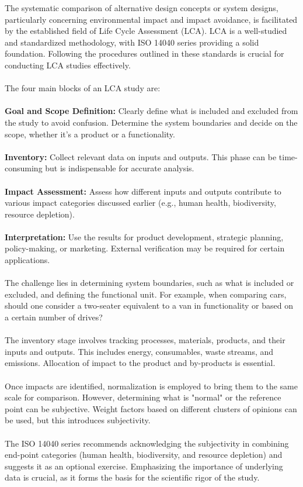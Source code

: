 \documentclass[../summary.tex]{subfiles}
\begin{document}
The systematic comparison of alternative design concepts or system designs, particularly concerning environmental impact and impact avoidance, is facilitated by the established field of Life Cycle Assessment (LCA). LCA is a well-studied and standardized methodology, with ISO 14040 series providing a solid foundation. Following the procedures outlined in these standards is crucial for conducting LCA studies effectively.\\
\\
The four main blocks of an LCA study are:\\
\\
\textbf{Goal and Scope Definition:} Clearly define what is included and excluded from the study to avoid confusion. Determine the system boundaries and decide on the scope, whether it's a product or a functionality.\\
\\
\textbf{Inventory:} Collect relevant data on inputs and outputs. This phase can be time-consuming but is indispensable for accurate analysis.\\
\\
\textbf{Impact Assessment:} Assess how different inputs and outputs contribute to various impact categories discussed earlier (e.g., human health, biodiversity, resource depletion).\\
\\
\textbf{Interpretation:} Use the results for product development, strategic planning, policy-making, or marketing. External verification may be required for certain applications.\\
\\
The challenge lies in determining system boundaries, such as what is included or excluded, and defining the functional unit. For example, when comparing cars, should one consider a two-seater equivalent to a van in functionality or based on a certain number of drives?\\
\\
The inventory stage involves tracking processes, materials, products, and their inputs and outputs. This includes energy, consumables, waste streams, and emissions. Allocation of impact to the product and by-products is essential.\\
\\
Once impacts are identified, normalization is employed to bring them to the same scale for comparison. However, determining what is "normal" or the reference point can be subjective. Weight factors based on different clusters of opinions can be used, but this introduces subjectivity.\\
\\
The ISO 14040 series recommends acknowledging the subjectivity in combining end-point categories (human health, biodiversity, and resource depletion) and suggests it as an optional exercise. Emphasizing the importance of underlying data is crucial, as it forms the basis for the scientific rigor of the study.
\newpage
\end{document}
